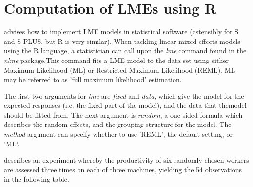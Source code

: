 \documentclass[12pt, a4paper]{report}
\begin{document}
\section{Computation of LMEs using R} \cite{PB} advises how to
implement LME models in statistical software (ostensibly for S and
S PLUS, but R is very similar). When tackling linear mixed effects
models using the R language, a statistician can call upon the
\emph{lme} command found in the \emph{nlme} package.This command
fits a LME model to the data set using either Maximum Likelihood
(ML) or Restricted Maximum Likelihood (REML). ML may be referred
to as 'full maximum likelihood' estimation.

The first two arguments for \emph{lme} are \emph{fixed} and
\emph{data}, which give the model for the expected responses (i.e.
the fixed part of the model), and the data that themodel should be
fitted from. The next argument is  \emph{random}, a one-sided
formula which describes the random effects, and the grouping
structure for the model. The  \emph{method} argument can specify
whether to use 'REML', the default setting, or 'ML'.

\citet{PB} describes an experiment whereby the productivity of six
randomly chosen workers are assessed three times on each of three
machines, yielding the 54 observations in the following table.
\end{document}
